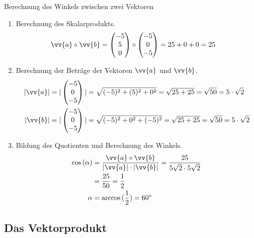 \begin{bsp}{Berechnung des Winkels zwischen zwei Vektoren}{}
\begin{enumerate}
    \item Berechnung des Skalarprodukts.
    \begin{equation*}
        \begin{split}
            \vv{a} \circ \vv{b} &= \begin{pmatrix} -5 \\5 \\0\end{pmatrix} \circ \begin{pmatrix} -5 \\0 \\-5 \end{pmatrix} = 25 +0 +0 = 25
            \end{split}
            \end{equation*}
    \item Berechnung der Beträge der Vektoren $\vv{a}$ und $\vv{b}$.
    \begin{equation*}
        \begin{split}
            |\vv{a}| & = |\begin{pmatrix} -5 \\0\\-5\end{pmatrix}| =  \sqrt{(-5)^2 + (5)^2 + 0^2}  = \sqrt{25+25} = \sqrt{50} = 5\cdot \sqrt{2}\\
            |\vv{b}| &= |\begin{pmatrix} -5 \\0\\-5\end{pmatrix} |= \sqrt{(-5)^2 + 0^2 + (-5)^2} = \sqrt{25+25}= \sqrt{50} = 5\cdot \sqrt{2}
            \end{split}
            \end{equation*}
    \item Bildung des Quotienten und Berechnung des Winkels.
    \begin{equation*}
        \begin{split}
            \cos{(\alpha)} &= \dfrac{\vv{a}\circ \vv{b}}{|\vv{a}| \cdot |\vv{b}|}= \dfrac{25}{5\sqrt{2} \cdot 5\sqrt{2}}\\
            &= \dfrac{25}{50} = \dfrac{1}{2}\\
            \alpha &= \arccos{(\dfrac{1}{2})} = 60^{\circ}
            \end{split}
            \end{equation*}
\end{enumerate}
\end{bsp}
\subsection{Das Vektorprodukt}